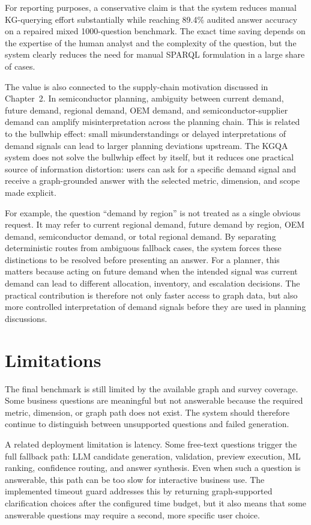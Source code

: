 \documentclass[
  12pt,
  english,
  oneside]{report}
\begin{document}
For reporting purposes, a conservative claim is that the system reduces manual KG-querying effort substantially while reaching 89.4\% audited answer accuracy on a repaired mixed 1000-question benchmark. The exact time saving depends on the expertise of the human analyst and the complexity of the question, but the system clearly reduces the need for manual SPARQL formulation in a large share of cases.

The value is also connected to the supply-chain motivation discussed in Chapter~2. In semiconductor planning, ambiguity between current demand, future demand, regional demand, OEM demand, and semiconductor-supplier demand can amplify misinterpretation across the planning chain. This is related to the bullwhip effect: small misunderstandings or delayed interpretations of demand signals can lead to larger planning deviations upstream. The KGQA system does not solve the bullwhip effect by itself, but it reduces one practical source of information distortion: users can ask for a specific demand signal and receive a graph-grounded answer with the selected metric, dimension, and scope made explicit.

For example, the question ``demand by region'' is not treated as a single obvious request. It may refer to current regional demand, future demand by region, OEM demand, semiconductor demand, or total regional demand. By separating deterministic routes from ambiguous fallback cases, the system forces these distinctions to be resolved before presenting an answer. For a planner, this matters because acting on future demand when the intended signal was current demand can lead to different allocation, inventory, and escalation decisions. The practical contribution is therefore not only faster access to graph data, but also more controlled interpretation of demand signals before they are used in planning discussions.

\section{Limitations}
\label{sec:discussion-limitations}

The final benchmark is still limited by the available graph and survey coverage. Some business questions are meaningful but not answerable because the required metric, dimension, or graph path does not exist. The system should therefore continue to distinguish between unsupported questions and failed generation.

A related deployment limitation is latency. Some free-text questions trigger the full fallback path: LLM candidate generation, validation, preview execution, ML ranking, confidence routing, and answer synthesis. Even when such a question is answerable, this path can be too slow for interactive business use. The implemented timeout guard addresses this by returning graph-supported clarification choices after the configured time budget, but it also means that some answerable questions may require a second, more specific user choice.
\end{document}
